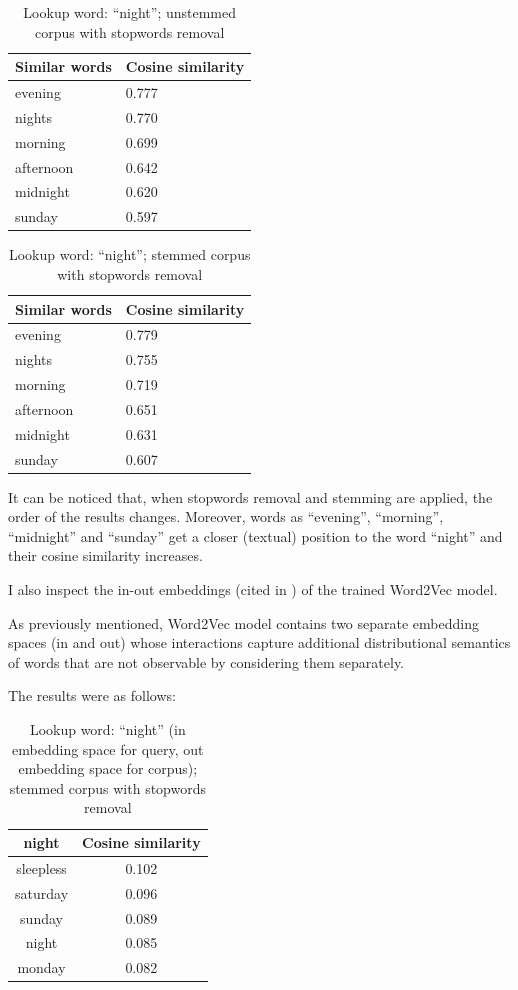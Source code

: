 \begin{table}[H]
\centering
\begin{tabular}{ll}
\textbf{Similar words} & \textbf{Cosine similarity} \\ \hline  
evening & 0.777 \\
nights & 0.770 \\
morning & 0.699 \\
afternoon & 0.642 \\
midnight & 0.620 \\
sunday & 0.597 \\
\end{tabular}
\caption{Lookup word: ``night''; unstemmed corpus with stopwords removal}
\end{table}

\begin{table}[H]
\centering
\begin{tabular}{ll}
\textbf{Similar words} & \textbf{Cosine similarity} \\ \hline  
evening & 0.779 \\
nights & 0.755 \\
morning & 0.719 \\
afternoon & 0.651 \\
midnight & 0.631 \\
sunday & 0.607 \\
\end{tabular}
\caption{Lookup word: ``night''; stemmed corpus with stopwords removal}
\end{table}

It can be noticed that, when stopwords removal and stemming are applied, the order of the results changes. Moreover, words as ``evening'', ``morning'', ``midnight'' and ``sunday'' get a closer (textual) position to the word ``night'' and their cosine similarity increases.

I also inspect the in-out embeddings (cited in \cite{Mitra2016ADE}) of the trained Word2Vec model.

As previously mentioned, Word2Vec model contains two separate embedding spaces (in and out) whose interactions capture additional distributional semantics of words that are not observable by considering them separately.

The results were as follows:

\begin{table}[H]
\centering
\begin{tabular}{cc}
\hline
\textbf{night} & \textbf{Cosine similarity} \\ \hline
sleepless & 0.102 \\
saturday & 0.096 \\
sunday & 0.089 \\
night & 0.085 \\
monday & 0.082\\
\hline
\end{tabular}
\caption{Lookup word: ``night'' (in embedding space for query, out embedding space for corpus); stemmed corpus with stopwords removal}
\label{tab:embsim2}
\end{table}

